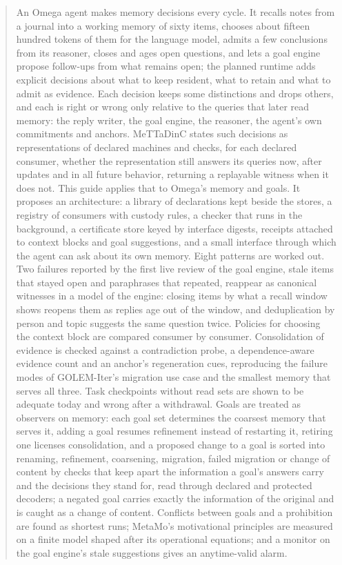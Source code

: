 \documentclass[11pt]{article}
\theoremstyle{definition}
\theoremstyle{plain}
\begin{document}
\begin{abstract}
\noindent
An Omega agent makes memory decisions every cycle. It recalls notes from a journal into a working
memory of sixty items, chooses about fifteen hundred tokens of them for the language model, admits
a few conclusions from its reasoner, closes and ages open questions, and lets a goal engine propose
follow-ups from what remains open; the planned runtime adds explicit decisions about what to keep
resident, what to retain and what to admit as evidence. Each decision keeps some
distinctions and drops others, and each is right or wrong only relative to the queries that later
read memory: the reply writer, the goal engine, the reasoner, the agent's own commitments and
anchors. MeTTaDinC states such decisions as representations of declared machines and checks, for
each declared consumer, whether the representation still answers its queries now, after updates
and in all future behavior, returning a replayable witness when it does not. This guide applies
that to Omega's memory and goals. It proposes an architecture: a library of declarations kept
beside the stores, a registry of consumers with custody rules, a checker that runs in the
background, a certificate store keyed by interface digests, receipts attached to context blocks
and goal suggestions, and a small interface through which the agent can ask about its own memory.
Eight patterns are worked out. Two failures reported by the first live review of the goal engine,
stale items that stayed open and paraphrases that repeated, reappear as canonical witnesses in a
model of the engine: closing items by what a recall window shows reopens them as replies age out of
the window, and deduplication by person and topic suggests the same question twice.
Policies for choosing the context block are compared consumer by consumer. Consolidation of
evidence is checked against a contradiction probe, a dependence-aware evidence count and an
anchor's regeneration cues, reproducing the failure modes of GOLEM-Iter's migration use case and
the smallest memory that serves all three. Task checkpoints without read sets are shown to be
adequate today and wrong after a withdrawal. Goals are treated as observers on memory: each goal
set determines the coarsest memory that serves it, adding a goal resumes refinement instead of
restarting it, retiring one licenses consolidation, and a proposed change to a goal is sorted into
renaming, refinement, coarsening, migration, failed migration or change of content by checks
that keep apart the information a
goal's answers carry and the decisions they stand for, read through declared and protected
decoders; a negated goal carries exactly the information of the original and is caught as a change
of content. Conflicts between goals and a
prohibition are found as shortest runs; MetaMo's motivational principles are measured on a finite
model shaped after its operational equations; and a monitor on the goal engine's stale suggestions gives
an anytime-valid alarm.
\end{abstract}
\end{document}
